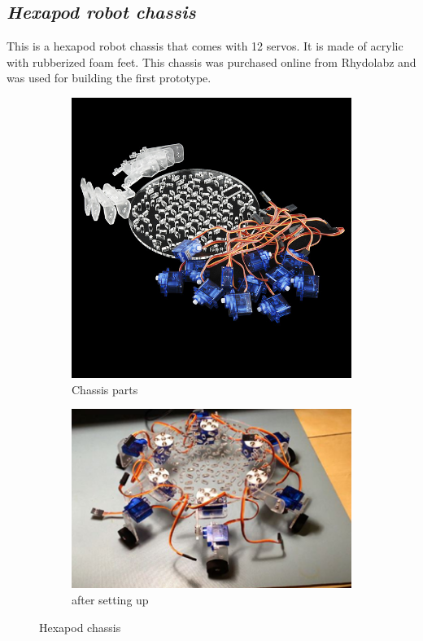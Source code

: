 \documentclass{report}
\begin{document}
\subsection*{\emph{Hexapod robot chassis}}
This is a hexapod robot chassis that comes with 12 servos. It is made of acrylic with rubberized foam feet. This chassis was purchased online from Rhydolabz and was used for building the first prototype.
\begin{figure}[h!]
\begin{subfigure}{0.5\textwidth}
	\centering
	\includegraphics[scale=0.14]{chassis.jpg}
\caption{Chassis parts}
\end{subfigure}%
%
\begin{subfigure}{0.5\textwidth}
	\centering
	\includegraphics[scale=0.5]{dagu}
	\caption{after setting up}
\end{subfigure}
\caption{Hexapod chassis}
\label{fig25}
\end{figure}          
\end{document}
